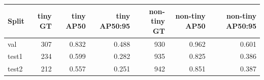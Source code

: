 \begin{tabular}{lrrrrrr}
\toprule
Split & tiny GT & tiny AP50 & tiny AP50:95 & non-tiny GT & non-tiny AP50 & non-tiny AP50:95 \\
\midrule
val & 307 & 0.832 & 0.488 & 930 & 0.962 & 0.601 \\
test1 & 234 & 0.599 & 0.282 & 935 & 0.825 & 0.386 \\
test2 & 212 & 0.557 & 0.251 & 942 & 0.851 & 0.387 \\
\bottomrule
\end{tabular}
